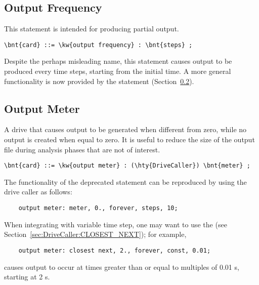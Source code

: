 \subsection{Output Frequency}
\label{sec:CONTROLDATA:OUTPUTFREQUENCY}
This statement is intended for producing partial output.
\begin{Verbatim}[commandchars=\\\{\}]
    \bnt{card} ::= \kw{output frequency} : \bnt{steps} ;
\end{Verbatim}
Despite the perhaps misleading name, this statement causes output to be produced
every  time steps, starting from the initial time.
A more general functionality is now provided by the 
statement (Section~\ref{sec:CONTROLDATA:OUTPUTMETER}).

\subsection{Output Meter}
\label{sec:CONTROLDATA:OUTPUTMETER}
A drive that causes output to be generated when different from zero,
while no output is created when equal to zero.  It is useful to reduce 
the size of the output file during analysis phases that are not of interest.
\begin{Verbatim}[commandchars=\\\{\}]
    \bnt{card} ::= \kw{output meter} : (\hty{DriveCaller}) \bnt{meter} ;
\end{Verbatim}
The functionality of the deprecated  statement
can be reproduced by using the  drive caller as follows:
\begin{verbatim}
    output meter: meter, 0., forever, steps, 10;
\end{verbatim}

When integrating with variable time step,
one may want to use the
 
(see Section~\ref{sec:DriveCaller:CLOSEST_NEXT}); for example,
\begin{verbatim}
    output meter: closest next, 2., forever, const, 0.01;
\end{verbatim}
causes output to occur at times greater than or equal to
multiples of 0.01 s, starting at 2 s.

